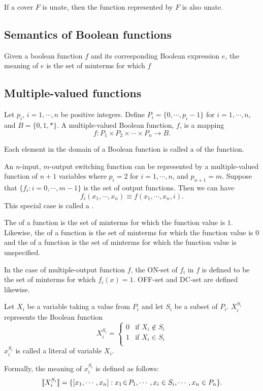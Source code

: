 \documentclass{myproc}
\begin{document}
\begin{theorem}
{\rm If a cover $F$ is unate, then the function represented by $F$ is 
also unate.}
\end{theorem}

\subsection{Semantics of Boolean functions}
Given a boolean function $f$ and its corresponding Boolean expression
$e$, the meaning of $e$ is the set of minterms for which $f$

\subsection{Multiple-valued functions}
\begin{definition}
Let $p_i$, $i = 1, \cdots, n$ be positive integers.
Define $P_i = \{0, \cdots, p_i - 1\}$ for $i = 1, \cdots, n$,
and $B = \{0, 1, *\}$.
A multiple-valued Boolean function, $f$, is a mapping
\[ f: P_1 \times P_2 \times \cdots \times P_n \rightarrow B.\]
\end{definition}

\begin{definition}[Minterms]
Each element in the domain of a Boolean function is called
a  of the function.
\end{definition}
An $n$-input, $m$-output switching function can be represented by a
multiple-valued function of $n+1$ variables where $p_i = 2$ for
$i = 1, \cdots, n$, and $p_{n+1} = m$.
Suppose that $\{f_i: i = 0, \cdots, m-1\}$ is the set of output functions.
Then we can have 
\[f_i(x_1, \cdots, x_n) \equiv f(x_1, \cdots, x_n, i).\]
This special case is called a .

\begin{definition}
The  of a function is the set of minterms for which the function
value is $1$. Likewise, the  of a function is 
the set of minterms for which the function value is $0$ and
the  of a function is the set of minterms for which the function
value is unspecified.
\end{definition}
In the case of multiple-output function $f$, the {ON-set} of $f_i$ 
in $f$ is defined to be the set of minterms for which $f_i(x) = 1$.
OFF-set and DC-set are defined likewise.

\begin{definition}[Literals]
Let $X_i$ be a variable taking a value from $P_i$ and let $S_i$ be a subset of
$P_i$. $X_i^{S_i}$ represents the Boolean function
\[X_i^{S_i} = \left\{\begin{array}{ll}
  0 & \mbox{if\ } X_i \not\in S_i\\
  1 & \mbox{if\ } X_i \in S_i\\
		     \end{array}\right.
\]
$x_i^{S_i}$ is called a literal of variable $X_i$.
\end{definition}
Formally, the meaning of $x_i^{S_i}$ is defined as follows:
\[ \mbox{$[\![X_i^{S_i}]\!]$} = \{[x_1, \cdots, x_n]:
  x_1\!\in\!P_1, \cdots, x_i \in S_i, \cdots, x_n \in P_n\}.\]
\end{document}
